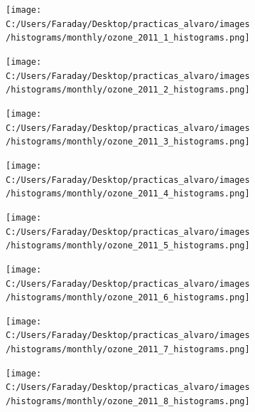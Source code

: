 \documentclass[12pt]{article}
\begin{document}
\newpage

\begin{figure}[H]
\centering
\begin{subfigure}[h]{0.45\textwidth}
\texttt{[image: C:/Users/Faraday/Desktop/practicas\_alvaro/images/histograms/monthly/ozone\_2011\_1\_histograms.png]}
\caption{}
\label{fig:hist-mon-2-1-2011}
\end{subfigure}
%
\begin{subfigure}[H]{0.45\textwidth}
\texttt{[image: C:/Users/Faraday/Desktop/practicas\_alvaro/images/histograms/monthly/ozone\_2011\_2\_histograms.png]}
\caption{}
\label{fig:hist-mon-2-2-2011}
\end{subfigure}
\caption{}
\end{figure}

\begin{figure}[H]
\centering
\begin{subfigure}[h]{0.45\textwidth}
\texttt{[image: C:/Users/Faraday/Desktop/practicas\_alvaro/images/histograms/monthly/ozone\_2011\_3\_histograms.png]}
\caption{}
\label{fig:hist-mon-2-3-2011}
\end{subfigure}
%
\begin{subfigure}[H]{0.45\textwidth}
\texttt{[image: C:/Users/Faraday/Desktop/practicas\_alvaro/images/histograms/monthly/ozone\_2011\_4\_histograms.png]}
\caption{}
\label{fig:hist-mon-2-4-2011}
\end{subfigure}
\caption{}
\end{figure}

\begin{figure}[H]
\centering
\begin{subfigure}[h]{0.45\textwidth}
\texttt{[image: C:/Users/Faraday/Desktop/practicas\_alvaro/images/histograms/monthly/ozone\_2011\_5\_histograms.png]}
\caption{}
\label{fig:hist-mon-2-5-2011}
\end{subfigure}
%
\begin{subfigure}[H]{0.45\textwidth}
\texttt{[image: C:/Users/Faraday/Desktop/practicas\_alvaro/images/histograms/monthly/ozone\_2011\_6\_histograms.png]}
\caption{}
\label{fig:hist-mon-2-6-2011}
\end{subfigure}
\caption{}
\end{figure}

\newpage

\begin{figure}[H]
\centering
\begin{subfigure}[h]{0.45\textwidth}
\texttt{[image: C:/Users/Faraday/Desktop/practicas\_alvaro/images/histograms/monthly/ozone\_2011\_7\_histograms.png]}
\caption{}
\label{fig:hist-mon-2-7-2011}
\end{subfigure}
%
\begin{subfigure}[H]{0.45\textwidth}
\texttt{[image: C:/Users/Faraday/Desktop/practicas\_alvaro/images/histograms/monthly/ozone\_2011\_8\_histograms.png]}
\caption{}
\label{fig:hist-mon-2-8-2011}
\end{subfigure}
\caption{}
\end{figure}
\end{document}
